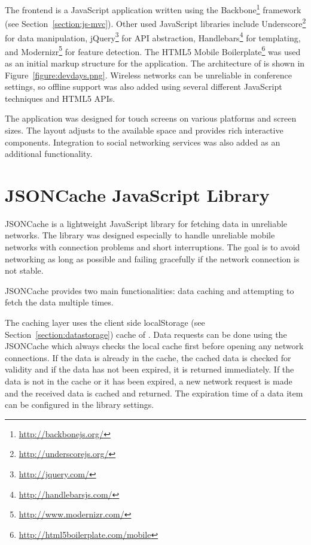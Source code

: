 The frontend is a JavaScript application written using the
Backbone\footnote{\url{http://backbonejs.org/}}  framework
(see Section~\ref{section:js-mvc}). Other used JavaScript libraries
include Underscore\footnote{\url{http://underscorejs.org/}} for data
manipulation, jQuery\footnote{\url{http://jquery.com/}} for 
API abstraction, Handlebars\footnote{\url{http://handlebarsjs.com/}}
for templating, and
Modernizr\footnote{\url{http://www.modernizr.com/}} for feature
detection. The HTML5 Mobile
Boilerplate\footnote{\url{http://html5boilerplate.com/mobile}} was
used as an initial markup structure for the application. The
architecture of is shown in Figure~\ref{figure:devdays.png}. Wireless
networks can be unreliable in conference settings, so offline support
was also added using several different JavaScript techniques and HTML5
APIs.

The application was designed for touch screens on various platforms
and screen sizes. The layout adjusts to the available space and
provides rich interactive components. Integration to social networking
services was also added as an additional functionality.


\section{JSONCache JavaScript Library}
\label{section:jsoncache}

JSONCache is a lightweight JavaScript library for fetching 
data in unreliable networks. The library was designed especially to
handle unreliable mobile networks with connection problems and short
interruptions. The goal is to avoid networking as long as possible and
failing gracefully if the network connection is not stable.

JSONCache provides two main functionalities: data caching and
attempting to fetch the data multiple times.

The caching layer uses the client side localStorage (see
Section~\ref{section:datastorage}) cache of . Data
requests can be done using the JSONCache  which always
checks the local cache first before opening any network
connections. If the data is already in the cache, the cached data is
checked for validity and if the data has not been expired, it is
returned immediately. If the data is not in the cache or it has been
expired, a new network request is made and the received data is cached
and returned. The expiration time of a data item can be configured in
the library settings.

